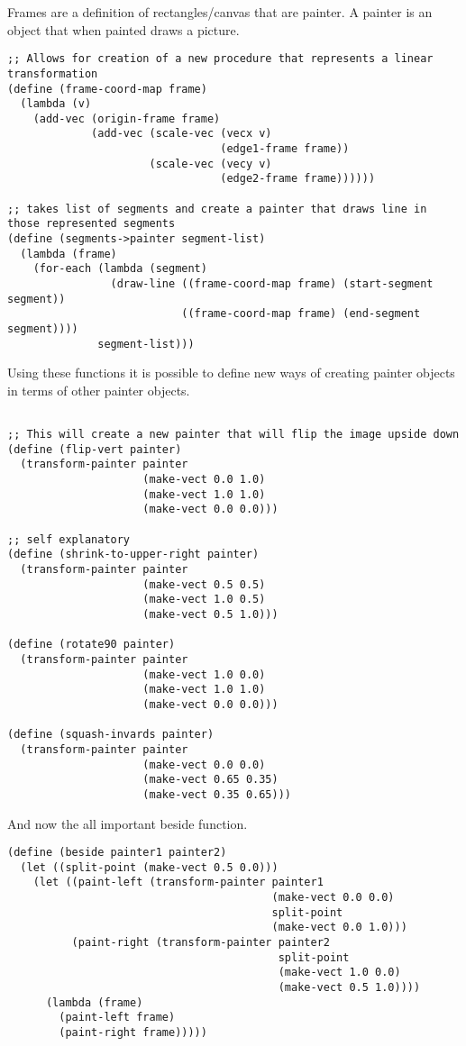 \documentclass[11pt]{article}
\begin{document}
\begin{enumerate}
Frames are a definition of rectangles/canvas that are painter. A painter
is an object that when painted draws a picture.

\begin{verbatim}
;; Allows for creation of a new procedure that represents a linear transformation
(define (frame-coord-map frame)
  (lambda (v)
    (add-vec (origin-frame frame)
             (add-vec (scale-vec (vecx v)
                                 (edge1-frame frame))
                      (scale-vec (vecy v)
                                 (edge2-frame frame))))))

;; takes list of segments and create a painter that draws line in those represented segments
(define (segments->painter segment-list)
  (lambda (frame)
    (for-each (lambda (segment)
                (draw-line ((frame-coord-map frame) (start-segment segment))
                           ((frame-coord-map frame) (end-segment segment))))
              segment-list)))
\end{verbatim}

Using these functions it is possible to define new ways of creating
painter objects in terms of other painter objects.

\begin{verbatim}

;; This will create a new painter that will flip the image upside down
(define (flip-vert painter)
  (transform-painter painter
                     (make-vect 0.0 1.0)
                     (make-vect 1.0 1.0)
                     (make-vect 0.0 0.0)))

;; self explanatory
(define (shrink-to-upper-right painter)
  (transform-painter painter
                     (make-vect 0.5 0.5)
                     (make-vect 1.0 0.5)
                     (make-vect 0.5 1.0)))

(define (rotate90 painter)
  (transform-painter painter
                     (make-vect 1.0 0.0)
                     (make-vect 1.0 1.0)
                     (make-vect 0.0 0.0)))

(define (squash-invards painter)
  (transform-painter painter
                     (make-vect 0.0 0.0)
                     (make-vect 0.65 0.35)
                     (make-vect 0.35 0.65)))
\end{verbatim}

And now the all important beside function.

\begin{verbatim}
(define (beside painter1 painter2)
  (let ((split-point (make-vect 0.5 0.0)))
    (let ((paint-left (transform-painter painter1
                                         (make-vect 0.0 0.0)
                                         split-point
                                         (make-vect 0.0 1.0)))
          (paint-right (transform-painter painter2
                                          split-point
                                          (make-vect 1.0 0.0)
                                          (make-vect 0.5 1.0))))
      (lambda (frame)
        (paint-left frame)
        (paint-right frame)))))
\end{verbatim}


\end{enumerate}
\end{document}
